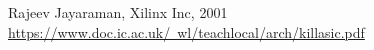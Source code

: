  


\begin{latin}
	\begin{thebibliography}{9}
		Rajeev Jayaraman, Xilinx Inc, 2001 \href{https://www.doc.ic.ac.uk/~wl/teachlocal/arch/killasic.pdf}{https://www.doc.ic.ac.uk/~wl/teachlocal/arch/killasic.pdf}
		
	\end{thebibliography} 
\end{latin}